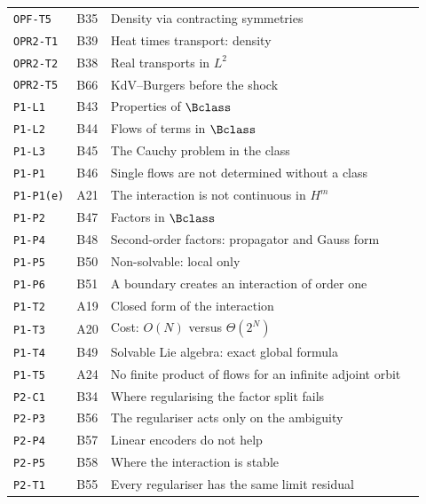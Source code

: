 \begin{center}
\begin{longtable}{@{}L{3.0cm}L{1.2cm}L{8.4cm}L{1.2cm}@{}}
\texttt{OPF-T5} & B35 & Density via contracting symmetries & \pageref{dim:OPF-T5}\\
\texttt{OPR2-T1} & B39 & Heat times transport: density & \pageref{dim:OPR2-T1}\\
\texttt{OPR2-T2} & B38 & Real transports in $L^2$ & \pageref{dim:OPR2-T2}\\
\texttt{OPR2-T5} & B66 & KdV--Burgers before the shock & \pageref{dim:OPR2-T5}\\
\texttt{P1-L1} & B43 & Properties of $\Bclass$ & \pageref{dim:P1-L1}\\
\texttt{P1-L2} & B44 & Flows of terms in $\Bclass$ & \pageref{dim:P1-L2}\\
\texttt{P1-L3} & B45 & The Cauchy problem in the class & \pageref{dim:P1-L3}\\
\texttt{P1-P1} & B46 & Single flows are not determined without a class & \pageref{dim:P1-P1}\\
\texttt{P1-P1(e)} & A21 & The interaction is not continuous in $H^m$ & \pageref{dim:P1-P1(e)}\\
\texttt{P1-P2} & B47 & Factors in $\Bclass$ & \pageref{dim:P1-P2}\\
\texttt{P1-P4} & B48 & Second-order factors: propagator and Gauss form & \pageref{dim:P1-P4}\\
\texttt{P1-P5} & B50 & Non-solvable: local only & \pageref{dim:P1-P5}\\
\texttt{P1-P6} & B51 & A boundary creates an interaction of order one & \pageref{dim:P1-P6}\\
\texttt{P1-T2} & A19 & Closed form of the interaction & \pageref{dim:P1-T2}\\
\texttt{P1-T3} & A20 & Cost: $O(N)$ versus $\Theta(2^N)$ & \pageref{dim:P1-T3}\\
\texttt{P1-T4} & B49 & Solvable Lie algebra: exact global formula & \pageref{dim:P1-T4}\\
\texttt{P1-T5} & A24 & No finite product of flows for an infinite adjoint orbit & \pageref{dim:P1-T5}\\
\texttt{P2-C1} & B34 & Where regularising the factor split fails & \pageref{dim:P2-C1}\\
\texttt{P2-P3} & B56 & The regulariser acts only on the ambiguity & \pageref{dim:P2-P3}\\
\texttt{P2-P4} & B57 & Linear encoders do not help & \pageref{dim:P2-P4}\\
\texttt{P2-P5} & B58 & Where the interaction is stable & \pageref{dim:P2-P5}\\
\texttt{P2-T1} & B55 & Every regulariser has the same limit residual & \pageref{dim:P2-T1}\\

\end{longtable}
\end{center}
